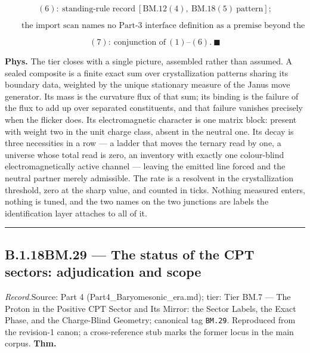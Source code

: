 \documentclass[11pt,openany]{report}
\theoremstyle{canonplain}
\theoremstyle{canondef}
\begin{document}
\[
(6):\ \text{standing-rule record}\ [\mathrm{BM.12}(4),\ \mathrm{BM.18}(5)\ \text{pattern}];
\]

\[
\qquad \text{the import scan names no Part-3 interface definition as a premise beyond the dispositioned ones}
\]

\[
(7):\ \text{conjunction of}\ (1)\text{–}(6).\ \blacksquare
\]

\textbf{Phys.} The tier closes with a single picture, assembled rather than assumed. A sealed composite is a finite exact sum over crystallization patterns sharing its boundary data, weighted by the unique stationary measure of the Janus move generator. Its mass is the curvature flux of that sum; its binding is the failure of the flux to add up over separated constituents, and that failure vanishes precisely when the flicker does. Its electromagnetic character is one matrix block: present with weight two in the unit charge class, absent in the neutral one. Its decay is three necessities in a row — a ladder that moves the ternary read by one, a universe whose total read is zero, an inventory with exactly one colour-blind electromagnetically active channel — leaving the emitted line forced and the neutral partner merely admissible. The rate is a resolvent in the crystallization threshold, zero at the sharp value, and counted in ticks. Nothing measured enters, nothing is tuned, and the two names on the two junctions are labels the identification layer attaches to all of it.

\vspace{2pt}\noindent\rule{\textwidth}{0.4pt}\vspace{2pt}

\medskip
\subsection*{\texorpdfstring{B.1.18\quad BM.29 — The status of the CPT sectors: adjudication and scope}{BM.29 B.1.18}}
\label{tag:BM-29}
{\small \textit{Record.}\quad Source: Part 4 (Part4\_Baryomesonic\_era.md); tier: Tier BM.7 — The Proton in the Positive CPT Sector and Its Mirror: the Sector Labels, the Exact Phase, and the Charge-Blind Geometry; canonical tag \texttt{BM.29}. Reproduced from the revision-1 canon; a cross-reference stub marks the former locus in the main corpus.}
\medskip
\textbf{Thm.}
\end{document}
